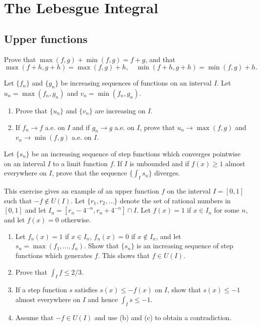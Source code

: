 \chapter{The Lebesgue Integral}

\section{Upper functions}

\begin{problembox}
Prove that $\max(f, g) + \min(f, g) = f + g$, and that 
\[ \max(f + h, g + h) = \max(f, g) + h, \quad \min(f + h, g + h) = \min(f, g) + h. \]
\end{problembox}

\begin{problembox}
Let $\{f_n\}$ and $\{g_n\}$ be increasing sequences of functions on an interval $I$. Let $u_n = \max(f_n, g_n)$ and $v_n = \min(f_n, g_n)$.
\begin{enumerate}[label=(\alph*)]
    \item Prove that $\{u_n\}$ and $\{v_n\}$ are increasing on $I$.
    \item If $f_n \to f$ a.e. on $I$ and if $g_n \to g$ a.e. on $I$, prove that $u_n \to \max(f, g)$ and $v_n \to \min(f, g)$ a.e. on $I$.
\end{enumerate}
\end{problembox}

\begin{problembox}
Let $\{s_n\}$ be an increasing sequence of step functions which converges pointwise on an interval $I$ to a limit function $f$. If $I$ is unbounded and if $f(x) \geq 1$ almost everywhere on $I$, prove that the sequence $\{\int_I s_n\}$ diverges.
\end{problembox}

\begin{problembox}
This exercise gives an example of an upper function $f$ on the interval $I = [0, 1]$ such that $-f \notin U(I)$. Let $\{r_1, r_2, \ldots\}$ denote the set of rational numbers in $[0, 1]$ and let $I_n = [r_n - 4^{-n}, r_n + 4^{-n}] \cap I$. Let $f(x) = 1$ if $x \in I_n$ for some $n$, and let $f(x) = 0$ otherwise.
\begin{enumerate}[label=(\alph*)]
    \item Let $f_n(x) = 1$ if $x \in I_n$, $f_n(x) = 0$ if $x \notin I_n$, and let $s_n = \max(f_1, \ldots, f_n)$. Show that $\{s_n\}$ is an increasing sequence of step functions which generates $f$. This shows that $f \in U(I)$.
    \item Prove that $\int_I f \leq 2/3$.
    \item If a step function $s$ satisfies $s(x) \leq -f(x)$ on $I$, show that $s(x) \leq -1$ almost everywhere on $I$ and hence $\int_I s \leq -1$.
    \item Assume that $-f \in U(I)$ and use (b) and (c) to obtain a contradiction.
\end{enumerate}
\end{problembox}

